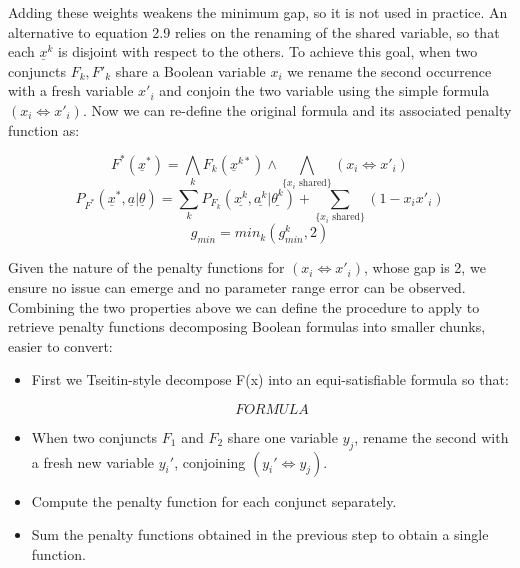 Adding these weights weakens the minimum gap, so it is not used in practice. An alternative to equation 2.9 relies on the renaming of the shared variable, so that each $\underline{x}^k$ is disjoint with respect to the others. To achieve this goal, when two conjuncts $F_k, F'_k$ share a Boolean variable $x_i$ we rename the second occurrence with a fresh variable $x'_i$ and conjoin the two variable using the simple formula $(x_i \iff x'_i)$. Now we can re-define the original formula and its associated penalty function as:

\begin{equation*}
    F^*(\underline{x}^*) = \bigwedge_k F_k(\underline{x}^{k*}) \land \bigwedge_{\{ x_i \textrm{  shared}\}} (x_i \iff x'_i) 
\end{equation*}
\begin{equation}
    P_{F^*}(\underline{x}^*,\underline{a}|\underline{\theta}) = \sum_k P_{F_k}(\underline{x^k},\underline{a^k}|\underline{\theta^k}) + \sum_{\{ x_i \textrm{  shared}\}} (1 - x_ix'_i)
\end{equation}
\begin{equation*}
    g_{min} = min_k(g^k_{min},2)
\end{equation*}

Given the nature of the penalty functions for $(x_i \iff x'_i)$, whose gap is 2, we ensure no issue can emerge and no parameter range error can be observed.
Combining the two properties above we can define the procedure to apply to retrieve penalty functions decomposing Boolean formulas into smaller chunks, easier to convert:

\begin{itemize}
    \item First we Tseitin-style decompose F(x) into an equi-satisfiable formula so that:
    
    \begin{equation}
        FORMULA
    \end{equation}
    \item When two conjuncts $F_1$ and $F_2$ share one variable $y_j$, rename the second with a fresh new variable $y_i'$, conjoining $(y_i' \iff y_j)$.
    \item Compute the penalty function for each conjunct separately.
    \item Sum the penalty functions obtained in the previous step to obtain a single function. 
\end{itemize}

